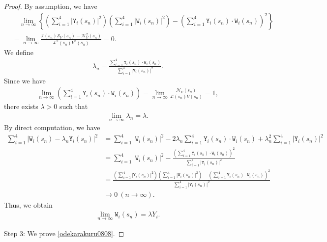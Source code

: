 \documentclass[reqno]{amsart}
\theoremstyle{plain}
\theoremstyle{definition}
\numberwithin{equation}{section}
\begin{document}
\begin{proof}
By assumption, we have
\begin{align*}
&\quad \lim_{n\to\infty}\left\{\left(\sum_{i=1}^4\left|\mathtt{Y}_i(s_n)\right|^2\right)\left(\sum_{i=1}^4\left|\mathtt{W}_i(s_n)\right|^2\right)-\left(\sum_{i=1}^4 \mathtt{Y}_i(s_n)\cdot\mathtt{W}_i(s_n)\right)^2\right\}
\\
&=\lim_{n\to\infty}\frac{\mathcal{I}(s_n)\mathcal{S}_V(s_n)-\mathcal{N}_V^2(s_n)}{\mathcal{L}^2(s_n)V^2(s_n)}=0.
\end{align*}
We define
\begin{align*}
\lambda_n=\frac{\sum_{i=1}^4\mathtt{Y}_i(s_n)\cdot \mathtt{W}_i(s_n)}{\sum_{i=1}^4\left|\mathtt{Y}_i(s_n)\right|^2}.
\end{align*}
Since we have
\begin{align*}
\lim_{n\to\infty}\left(\sum_{i=1}^4\mathtt{Y}_i(s_n)\cdot \mathtt{W}_i(s_n)\right)=\lim_{n\to\infty}\frac{\mathcal{N}_V(s_n)}{\mathcal{L}(s_n)V(s_n)}=1,
\end{align*}
there exists $\lambda>0$ such that 
\begin{align*}
\lim_{n\to\infty}\lambda_n=\lambda.
\end{align*}
By direct computation, we have
\begin{align*}
\sum_{i=1}^4\left|\mathtt{W}_i(s_n)-\lambda_n\mathtt{Y}_i(s_n)\right|^2&=\sum_{i=1}^4\left|\mathtt{W}_i(s_n)\right|^2-2\lambda_n\sum_{i=1}^4\mathtt{Y}_i(s_n)\cdot \mathtt{W}_i(s_n)+\lambda_n^2\sum_{i=1}^4\left|\mathtt{Y}_i(s_n)\right|^2
\\
&=\sum_{i=1}^4\left|\mathtt{W}_i(s_n)\right|^2-\frac{\left(\sum_{i=1}^4\mathtt{Y}_i(s_n)\cdot \mathtt{W}_i(s_n)\right)^2}{\sum_{i=1}^4\left|\mathtt{Y}_i(s_n)\right|^2}
\\
&=\frac{\left(\sum_{i=1}^4\left|\mathtt{Y}_i(s_n)\right|^2\right)\left(\sum_{i=1}^4\left|\mathtt{W}_i(s_n)\right|^2\right)-\left(\sum_{i=1}^4 \mathtt{Y}_i(s_n)\cdot\mathtt{W}_i(s_n)\right)^2}{\sum_{i=1}^4\left|\mathtt{Y}_i(s_n)\right|^2}
\\
&\to 0 \ (n\to\infty).
\end{align*}
Thus, we obtain
\begin{align}\label{Whyouka0808}
\lim_{n\to\infty}\mathtt{W}_i(s_n)=\lambda Y_i.
\end{align}


Step 3: We prove \eqref{odekarakuru0808}.


\end{proof}
\end{document}
